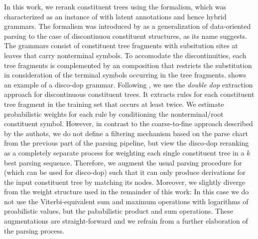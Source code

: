 \documentclass[../document.tex]{subfiles}
\begin{document}
    In this work, we rerank constituent trees using the  formalism, which was characterized as an instance of  with latent annotations \citep[cf.\@ section~4]{Cranenbourgh11} and hence hybrid grammars. \citep[cf.\@ section~8.5.1]{Geb20}
    The formalism was introduced by \citet{Cranenbourgh11} as a generalization of data-oriented parsing \citep{Bod02} to the case of discontinuou constituent structures, as its name suggests.
    The grammars consist of constituent tree fragments with subsitution sites at leaves that carry nonterminal symbols.
    To accomodate the discontinuities, each tree fragments is complemented by an  composition that restricts the substitution in consideration of the terminal symbols occurring in the tree fragments.
     shows an example of a disco-dop grammar.
    Following \citet{Cranenbourgh16}, we use the \emph{double dop} extraction approach for discontinuous constituent trees.
    It extracts rules for each constituent tree fragment in the training set that occurs at least twice.
    We estimate probabilistic weights for each rule by conditioning the  nonterminal/root constituent symbol.
    However, in contrast to the coarse-to-fine approach described by the authots, we do not define a filtering mechanism based on the parse chart from the previous part of the parsing pipeline, but view the disco-dop reranking as a completely separate process for weighting each single constituent tree in a \(k\) best parsing sequence.
    Therefore, we augment the usual parsing procedure for  (which can be used for disco-dop) such that it can only produce derivations for the input constituent tree by matching its nodes.
    Moreover, we slightly diverge from the weight structure used in the remainder of this work:
        In this case we do not use the Viterbi-equivalent sum and maximum operations with logarithms of proabilistic values, but the pababilistic product and sum operations.
    These augmentations are straight-forward and we refrain from a further elaboration of the parsing process.
    
        
    
        
    
    \ifSubfilesClassLoaded{%
        \printindex
    }{}
\end{document}
